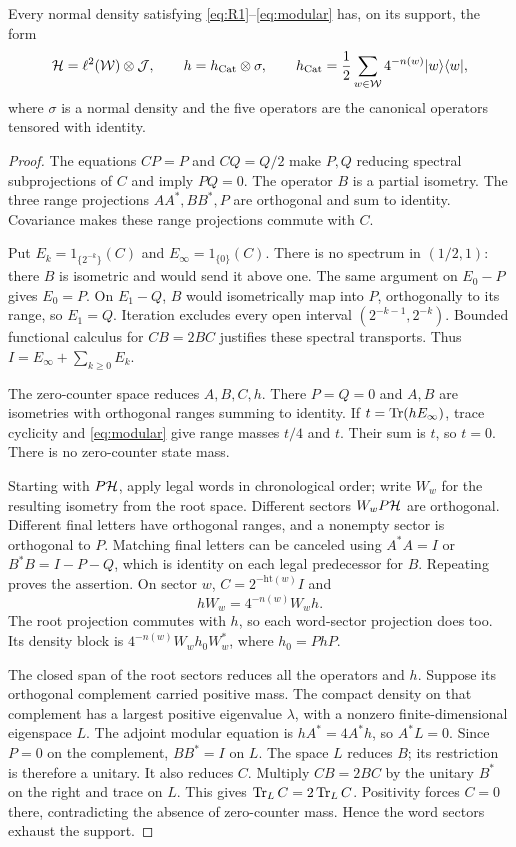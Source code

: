 \begin{lemma}\label{lem:normal}
Every normal density satisfying \eqref{eq:R1}--\eqref{eq:modular} has, on its support, the form
\[
 \mathcal H=\ell^2(\mathcal W)\otimes\mathcal J,\qquad
 h=h_{\mathrm{Cat}}\otimes\sigma,\qquad
 h_{\mathrm{Cat}}=\frac12\sum_{w\in\mathcal W}4^{-n(w)}|w\rangle\langle w|,
\]
where $\sigma$ is a normal density and the five operators are the canonical operators tensored with identity.
\end{lemma}
\begin{proof}
The equations $CP=P$ and $CQ=Q/2$ make $P,Q$ reducing spectral subprojections of $C$ and imply $PQ=0$. The operator $B$ is a partial isometry. The three range projections $AA^*,BB^*,P$ are orthogonal and sum to identity. Covariance makes these range projections commute with $C$.

Put $E_k=1_{\{2^{-k}\}}(C)$ and $E_\infty=1_{\{0\}}(C)$. There is no spectrum in $(1/2,1)$: there $B$ is isometric and would send it above one. The same argument on $E_0-P$ gives $E_0=P$. On $E_1-Q$, $B$ would isometrically map into $P$, orthogonally to its range, so $E_1=Q$. Iteration excludes every open interval $(2^{-k-1},2^{-k})$. Bounded functional calculus for $CB=2BC$ justifies these spectral transports. Thus $I=E_\infty+\sum_{k\geq0}E_k$.

The zero-counter space reduces $A,B,C,h$. There $P=Q=0$ and $A,B$ are isometries with orthogonal ranges summing to identity. If $t=\operatorname{Tr}(hE_\infty)$, trace cyclicity and \eqref{eq:modular} give range masses $t/4$ and $t$. Their sum is $t$, so $t=0$. There is no zero-counter state mass.

Starting with $P\mathcal H$, apply legal words in chronological order; write $W_w$ for the resulting isometry from the root space. Different sectors $W_wP\mathcal H$ are orthogonal. Different final letters have orthogonal ranges, and a nonempty sector is orthogonal to $P$. Matching final letters can be canceled using $A^*A=I$ or $B^*B=I-P-Q$, which is identity on each legal predecessor for $B$. Repeating proves the assertion. On sector $w$, $C=2^{-\mathrm{ht}(w)}I$ and
\[
 hW_w=4^{-n(w)}W_wh.
\]
The root projection commutes with $h$, so each word-sector projection does too. Its density block is $4^{-n(w)}W_wh_0W_w^*$, where $h_0=PhP$.

The closed span of the root sectors reduces all the operators and $h$. Suppose its orthogonal complement carried positive mass. The compact density on that complement has a largest positive eigenvalue $\lambda$, with a nonzero finite-dimensional eigenspace $L$. The adjoint modular equation is $hA^*=4A^*h$, so $A^*L=0$. Since $P=0$ on the complement, $BB^*=I$ on $L$. The space $L$ reduces $B$; its restriction is therefore a unitary. It also reduces $C$. Multiply $CB=2BC$ by the unitary $B^*$ on the right and trace on $L$. This gives $\operatorname{Tr}_LC=2\operatorname{Tr}_LC$. Positivity forces $C=0$ there, contradicting the absence of zero-counter mass. Hence the word sectors exhaust the support.


\end{proof}
